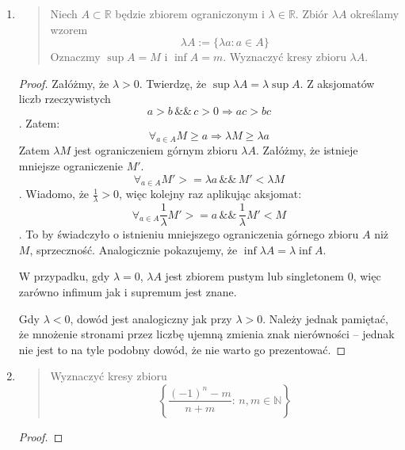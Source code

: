 \documentclass{article}
\begin{document}
\begin{enumerate}
\begin{proof}
    $$
    \left\{ \begin{array}{ll}
        \sqrt{\sqrt{5} + 3} + \sqrt{\sqrt{5} - 2} = p\\
        \sqrt{\sqrt{5} + 3} - \sqrt{\sqrt{5} - 2} = \frac{5}{p}\\
        p + \frac{5}{p} = 2 \sqrt{\sqrt{5} + 3}
    \end{array} \right.
    $$

    Sprzeczność, ponieważ lewa strona równania wymierna, a druga nie.
\end{proof}

\item \begin{quote}
    Niech $A \subset \mathbb{R}$ będzie zbiorem ograniczonym i
    $\lambda \in \mathbb{R}$. Zbiór $\lambda A$ określamy wzorem
    $$ \lambda A := \{ \lambda a : a \in A \} $$
    Oznaczmy $\sup A = M$ i $\inf A = m$. Wyznaczyć kresy zbioru
    $\lambda A$.
\end{quote}
\begin{proof}
    Załóżmy, że $\lambda > 0$.
    Twierdzę, że $\sup \lambda A = \lambda \sup A$.
    Z aksjomatów liczb rzeczywistych
    $$ a > b \,\&\&\, c > 0 \Rightarrow ac > bc $$.
    Zatem:
    $$ \forall_{a \in A} M \geq a \Rightarrow \lambda M \geq \lambda a$$
    Zatem $\lambda M$ jest ograniczeniem górnym zbioru $\lambda A$.
    Załóżmy, że istnieje mniejsze ograniczenie $M'$.
    $$ \forall_{a \in A} M' >= \lambda a \,\&\&\, M' < \lambda M $$.
    Wiadomo, że $\frac{1}{\lambda} > 0$, więc kolejny raz aplikując aksjomat:
    $$ \forall_{a \in A} \frac{1}{\lambda}M' >= a \,\&\&\, \frac{1}{\lambda}M' < M $$.
    To by świadczyło o istnieniu mniejszego ograniczenia górnego zbioru $A$ niż
    $M$, sprzeczność. Analogicznie pokazujemy, że $\inf \lambda A = \lambda \inf A$.

    W przypadku, gdy $\lambda = 0$, $\lambda A $ jest zbiorem pustym lub
    singletonem $0$, więc zarówno infimum jak i supremum jest znane.

    Gdy $\lambda < 0$, dowód jest analogiczny jak przy $\lambda > 0$.
    Należy jednak pamiętać, że mnożenie stronami przez liczbę ujemną
    zmienia znak nierówności -- jednak nie jest to na tyle podobny dowód, że
    nie warto go prezentować.
\end{proof}

\item \begin {quote}
Wyznaczyć kresy zbioru
$$ \left\{ \frac{(-1)^n - m}{n + m} : \, n,m \in \mathbb{N} \right\} $$
\end{quote}
\begin{proof}



\end{proof}

\end{enumerate}
\end{document}

